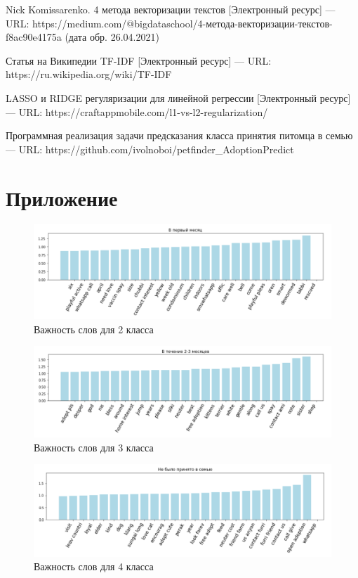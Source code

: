 \documentclass[14pt]{mmcs_article}
\begin{document}
\begin{thebibliography}{0}
Nick Komissarenko. 4 метода векторизации текстов [Электронный ресурс] --- URL: https://medium.com/@bigdataschool/4-метода-векторизации-текстов-f8ac90e4175a (дата обр. 26.04.2021)

Статья на Википедии TF-IDF [Электронный ресурс] --- URL: https://ru.wikipedia.org/wiki/TF-IDF 

LASSO и RIDGE регуляризации для линейной регрессии [Электронный ресурс] --- URL: https://craftappmobile.com/l1-vs-l2-regularization/

Программная реализация задачи предсказания класса принятия питомца в семью --- URL: https://github.com/ivolnoboi/petfinder\_AdoptionPredict


\end{thebibliography}



\newpage

\section*{Приложение}

\begin{figure}[H]
	\centering
	\includegraphics[scale=0.6]{words2.png}
	\caption{Важность слов для 2 класса}\label{text:words2}
\end{figure}

\begin{figure}[H]
	\centering
	\includegraphics[scale=0.6]{words3.png}
	\caption{Важность слов для 3 класса}\label{text:words3}
\end{figure}

\begin{figure}[H]
	\centering
	\includegraphics[scale=0.6]{words4.png}
	\caption{Важность слов для 4 класса}\label{text:words4}
\end{figure}
\end{document}

